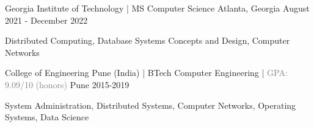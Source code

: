 
\begin{cventries}
  \cventry
    {} %
    {Georgia Institute of Technology | MS Computer Science} %
    {Atlanta, Georgia} %
    {August 2021 - December 2022} %
    {
      \vspace{-0.8cm}
      \begin{cvitems} %
         \item {Distributed Computing, Database Systems Concepts and Design, Computer Networks \entrydatestyle{}}
      \end{cvitems}
    }
  \vspace{-0.2cm}
  \cventry
    {\textbf{}} %
    {College of Engineering Pune (India)  |  BTech Computer Engineering  | \textcolor{gray}{GPA: 9.09/10 (honors)}} %
    {Pune} %
    {2015-2019} %
    {
      \vspace{-0.8cm}
      \begin{cvitems} %
         \item {System Administration, Distributed Systems, Computer Networks, Operating Systems, Data Science \entrydatestyle{}}
      \end{cvitems}
    }
    \vspace{-0.5cm}
\end{cventries}